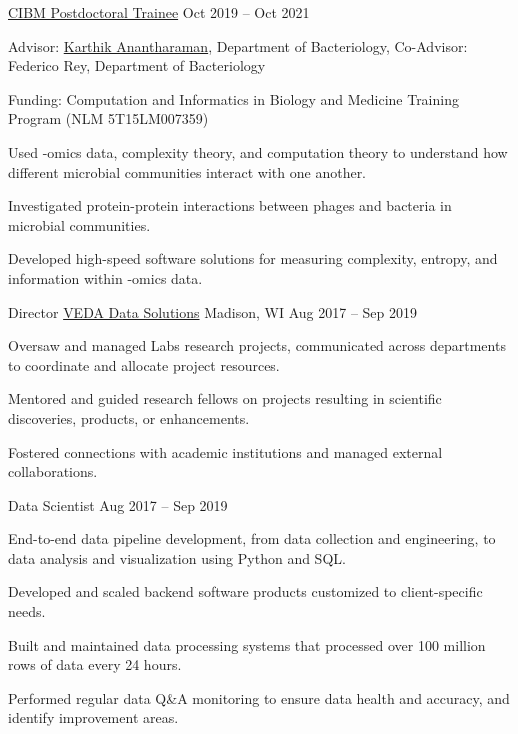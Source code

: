 \begin{cventries}
\cvsubposition
    {\href{http://www.cibm.wisc.edu/}{CIBM Postdoctoral Trainee}}
    {Oct 2019 -- Oct 2021}
    {
    \begin{cvitems}
       \item {Advisor: \href{https://anantharamanlab.com/}{Karthik Anantharaman}, Department of Bacteriology, Co-Advisor: Federico Rey, Department of Bacteriology}
       \item {Funding: Computation and Informatics in Biology and Medicine Training Program (NLM 5T15LM007359)}
       \item {Used -omics data, complexity theory, and computation theory to understand how different microbial communities interact with one another.}
       \item {Investigated protein-protein interactions between phages and bacteria in microbial communities.}
       \item {Developed high-speed software solutions for measuring complexity, entropy, and information within -omics data.}
    \end{cvitems}
    }

\cventry
    {Director}
    {\href{https://vedadata.com/}{VEDA Data Solutions}}
    {Madison, WI}
    {Aug 2017 -- Sep 2019}
    {
    \begin{cvitems}
       \item {Oversaw and managed Labs research projects, communicated across departments to coordinate and allocate project resources.}
       \item {Mentored and guided research fellows on projects resulting in scientific discoveries, products, or enhancements.}
       \item {Fostered connections with academic institutions and managed external collaborations.}
    \end{cvitems}
    }

\cvsubposition
    {Data Scientist}
    {Aug 2017 -- Sep 2019}
    {
    \begin{cvitems}
       \item {End-to-end data pipeline development, from data collection and engineering, to data analysis and visualization using Python and SQL.}
       \item {Developed and scaled backend software products customized to client-specific needs.}
       \item {Built and maintained data processing systems that processed over 100 million rows of data every 24 hours.}
       \item {Performed regular data Q\&A monitoring to ensure data health and accuracy, and identify improvement areas.}
    \end{cvitems}
    }


\end{cventries}

